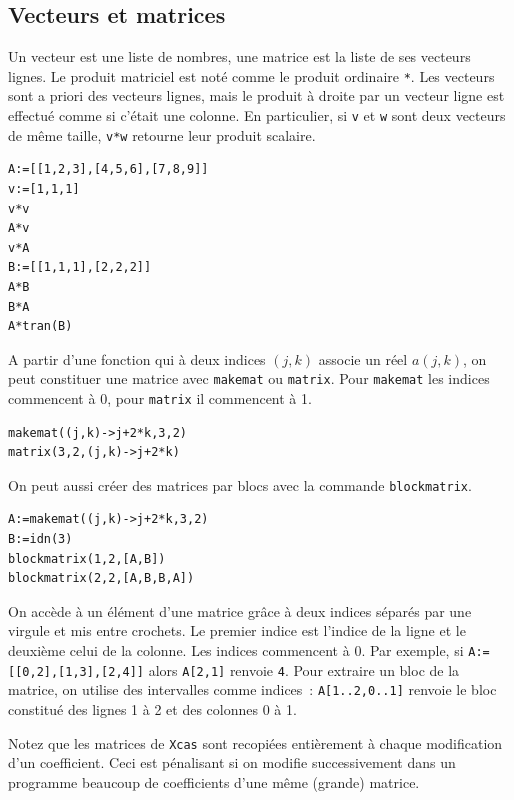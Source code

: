 \documentclass{article}
\begin{document}
\subsection{Vecteurs et matrices}
%
Un vecteur est une liste de nombres, une matrice est la liste de ses
vecteurs lignes. Le produit matriciel est not\'e comme le produit
ordinaire \verb|*|. Les vecteurs sont a priori des vecteurs lignes,
mais le produit \`a droite par un vecteur ligne est effectu\'e comme
si c'\'etait une colonne. En particulier, si \verb|v| et \verb|w| 
sont deux vecteurs de m\^eme taille, \verb|v*w| retourne leur produit
scalaire. 
\begin{verbatim}
A:=[[1,2,3],[4,5,6],[7,8,9]]
v:=[1,1,1]
v*v
A*v
v*A
B:=[[1,1,1],[2,2,2]]
A*B
B*A
A*tran(B)
\end{verbatim}
A partir d'une fonction qui \`a deux indices $(j,k)$ associe un r\'eel
$a(j,k)$, on peut constituer une matrice avec \verb|makemat| ou
\verb|matrix|. Pour \verb|makemat| les indices commencent \`a 0, pour
\verb|matrix| il commencent \` a 1.
\begin{verbatim}
makemat((j,k)->j+2*k,3,2)
matrix(3,2,(j,k)->j+2*k)
\end{verbatim}
On peut aussi cr\'eer des matrices par blocs avec la commande
\verb|blockmatrix|.
\begin{verbatim}
A:=makemat((j,k)->j+2*k,3,2)
B:=idn(3)
blockmatrix(1,2,[A,B])
blockmatrix(2,2,[A,B,B,A])
\end{verbatim}
On acc\`ede \`a un \'el\'ement d'une matrice gr\^ace \`a deux indices 
s\'epar\'es par une virgule et mis entre 
crochets. Le premier indice est l'indice de la ligne et le deuxi\`eme 
celui de la colonne. Les indices commencent \`a 0.
Par exemple, si \verb|A:=[[0,2],[1,3],[2,4]]| alors 
\verb|A[2,1]| renvoie \verb|4|.
Pour extraire un bloc de la matrice, on utilise des intervalles
comme indices~: \verb|A[1..2,0..1]| renvoie le bloc
constitu\'e des lignes 1 \`a 2 et des colonnes 0 \`a 1.

Notez que les matrices de {\tt Xcas} sont
recopi\'ees enti\`erement \`a chaque modification d'un coefficient.
Ceci est p\'enalisant si on modifie successivement 
dans un programme beaucoup
de coefficients d'une m\^eme (grande) matrice.
\end{document}
